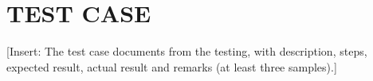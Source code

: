 \chapter{TEST CASE}
[Insert: The test case documents from the testing, with description, steps, expected result, actual result and remarks (at least three samples).]
